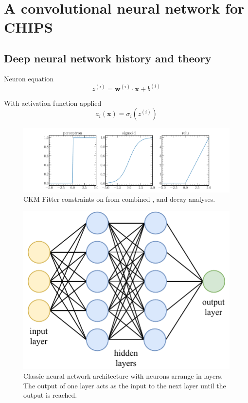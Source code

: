 \chapter{A convolutional neural network for CHIPS}
\label{chap:cvn}

\section{Deep neural network history and theory}

Neuron equation
\begin{equation}
    z^{(i)}=\boldsymbol{w}^{(i)}\cdot\boldsymbol{x}+b^{(i)}
\end{equation}

With activation function applied
\begin{equation}
    a_{i}(\boldsymbol{x})=\sigma_i(z^{(i)})
\end{equation}

\begin{figure}
    \includegraphics[width=\textwidth]{diagrams/6-cvn/activations.pdf}
    \caption[CKM Fitter constraints on \alphaCKM.]%
    {CKM Fitter constraints on \alphaCKM from combined \BToPiPi,
        \BToRhoPi and \BToRhoRho decay analyses.}
    \label{fig:activations}
\end{figure}

\begin{figure}
    \includegraphics[width=\largefigwidth]{diagrams/6-cvn/network.pdf}
    \caption[CKM Fitter constraints on \alphaCKM.]%
    {Classic neural network architecture with neurons arrange in layers.
        The output of one layer acts as the input to the next layer until the output is reached.}
    \label{fig:network}
\end{figure}

